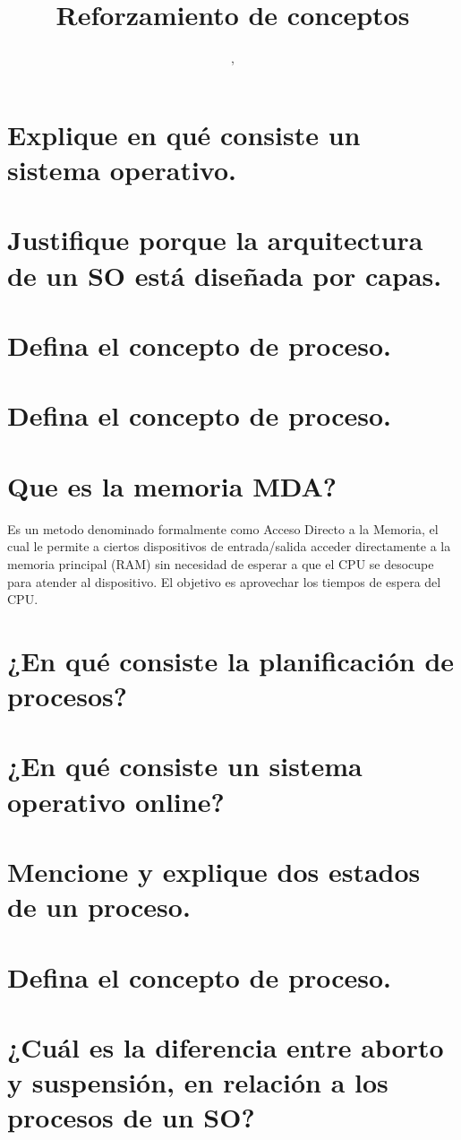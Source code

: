 \documentclass{article}
\author{\nombre , \carnet}
\title{\textbf{\Huge\titulo}\\Reforzamiento de conceptos}
\begin{document}
\maketitle
\section{Explique en qué consiste un sistema operativo.}

\section{Justifique porque la arquitectura de un SO está diseñada por capas.}

\section{Defina el concepto de proceso.}

\section{Defina el concepto de proceso.}

\section{Que es la memoria MDA?}
Es un metodo denominado formalmente como Acceso Directo a la Memoria, el cual le permite a ciertos dispositivos de entrada/salida acceder directamente a la memoria principal (RAM) sin necesidad de esperar a que el CPU se desocupe para atender al dispositivo. El objetivo es aprovechar los tiempos de espera del CPU.

\section{¿En qué consiste la planificación de procesos?}

\section{¿En qué consiste un sistema operativo online?}

\section{Mencione y explique dos estados de un proceso.}

\section{Defina el concepto de proceso.}

\section{¿Cuál es la diferencia entre aborto y suspensión, en relación a los procesos de un SO?}
\end{document}
